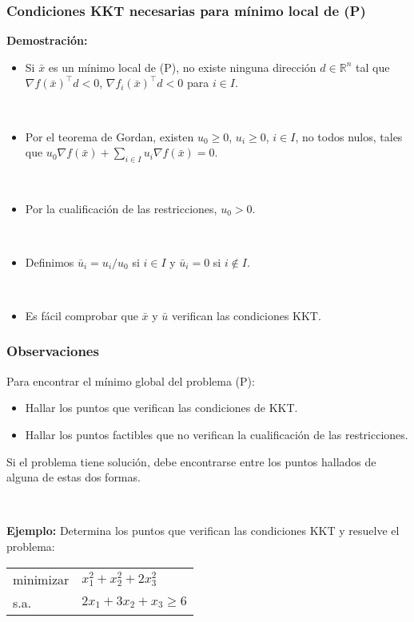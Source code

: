 \documentclass{beamer}
\begin{document}
\begin{frame}
\frametitle{Condiciones KKT necesarias para mínimo local de (P)}



\textbf{Demostración:} 

\begin{itemize}
\item Si $\bar{x}$ es un mínimo local de (P), no existe ninguna dirección $d\in\mathbb{R}^n$ tal que $\nabla f(\bar{x})^\top d<0$, $\nabla f_i(\bar{x})^\top d<0$ para $i\in I$.

\

\item Por el teorema de Gordan, existen $u_0\geq 0$, $u_i\geq 0$, $i\in I$, no todos nulos, tales que $u_0\nabla f(\bar{x}) + \sum_{i\in I}u_i\nabla f(\bar{x})=0$.

\

\item Por la cualificación de las restricciones, $u_0 > 0$.

\

\item Definimos  $\bar{u}_i=u_i/u_0$ si $i\in I$ y $\bar{u}_i=0$ si $i\notin I$.

\

\item Es fácil comprobar que $\bar{x}$ y $\bar{u}$ verifican las condiciones KKT. 
\end{itemize}



\end{frame}

\begin{frame}
\frametitle{Observaciones}

Para encontrar el mínimo global del problema (P):

\begin{itemize}
\item Hallar los puntos que verifican las condiciones de KKT.

\item Hallar los puntos factibles que no verifican  la cualificación de las restricciones.
\end{itemize}

Si el problema tiene solución, debe encontrarse entre los puntos hallados de alguna de estas dos formas.

\

\textbf{Ejemplo:} Determina los puntos que verifican las condiciones KKT y resuelve el problema:
\begin{center}
\begin{tabular}{ll}
minimizar & $x_1^2+x_2^2+2x_3^2$   \\
s.a. & $2x_1 + 3x_2 + x_3\geq 6$ \\
\end{tabular}
\end{center}



\end{frame}
\end{document}
